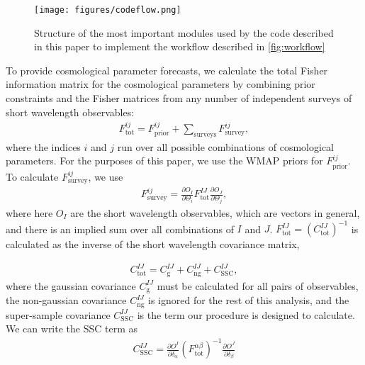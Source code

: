 \documentclass[a4paper,11pt]{article}
\begin{document}
\begin{figure}[!ht]
 \centering
\texttt{[image: figures/codeflow.png]}
  \caption{Structure of the most important modules used by the code described in this paper to implement the workflow described in \ref{fig:workflow} }
\label{fig:codeflow}
\end{figure}

To provide cosmological parameter forecasts, we calculate the total Fisher information matrix for the cosmological parameters by combining prior constraints and the Fisher matrices from any number of independent surveys of short wavelength observables:
\begin{align}\label{fisher_param}
F^{ij}_{\text{tot}}=F^{ij}_{\text{prior}}+\sum_{\text{surveys}}{F^{ij}_{\text{survey}}},
\end{align}
where the indices $i$ and $j$ run over all possible combinations of cosmological parameters. For the purposes of this paper, we use the WMAP priors\cite{jdem_fom} for $F^{ij}_{\text{prior}}$. To calculate  $F^{ij}_{\text{survey}}$, we use
\begin{align}\label{fisher_survey}
F^{ij}_{\text{survey}}=\frac{\partial O_I}{\partial \Theta_i} F^{IJ}_{\text{tot}}\frac{\partial O_J}{\partial \Theta_j},
\end{align}
where here $O_I$ are the short wavelength observables, which are vectors in general, and there is an implied sum over all combinations of $I$ and $J$. $F^{IJ}_{\text{tot}}=\left(C^{IJ}_{\text{tot}}\right)^{-1}$ is calculated as the inverse of the short wavelength covariance matrix, 

\begin{align}\label{cov_sw_tot}
C^{IJ}_{\text{tot}}=C^{IJ}_{\text{g}}+C^{IJ}_{\text{ng}}+C^{IJ}_{\text{SSC}},
\end{align}
where the gaussian covariance $C^{IJ}_{\text{g}}$ must be calculated for all pairs of observables, the non-gaussian covariance $C^{IJ}_{\text{ng}}$ is ignored for the rest of this analysis, and the super-sample covariance $C^{IJ}_{\text{SSC}}$ is the term our procedure is designed to calculate. We can write the SSC term as 
\begin{align}\label{cov_ssc}
C^{IJ}_{\text{SSC}} = \frac{\partial O^I}{\partial \delta_\alpha} (F^{\alpha\beta}_{\text{tot}})^{-1}\frac{\partial O^J}{\partial \delta_\beta} 
\end{align}
\end{document}
